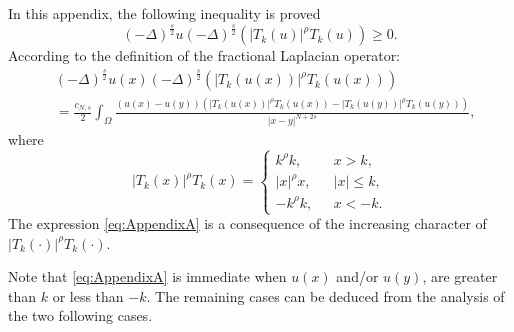 \documentclass[preprint,12pt]{elsarticle}
\begin{document}
		\section{}
		\label{appendix:A}
		In this appendix, the following inequality is proved
		\begin{equation}\label{eq:AppendixA}
			(-\Delta)^{\frac{s}{2}}u(-\Delta)^{\frac{s}{2}}(|T_k(u)|^{\rho}T_k(u))\geq 0.
		\end{equation}
		According to the definition of the fractional Laplacian operator:
		\begin{align*}
			&(-\Delta)^{\frac{s}{2}}u(x)(-\Delta)^{\frac{s}{2}}(|T_k(u(x))|^{\rho}T_k(u(x)))\\&=\frac{{c_{N,s}}}{2}\int_{\Omega}\frac{(u(x)-u(y))(|T_k(u(x))|^{\rho}T_k(u(x))-|T_k(u(y))|^{\rho}T_k(u(y)))}{|x-y|^{N+2s}},
		\end{align*}
		where
		\begin{displaymath} |T_k(x)|^{\rho}T_k(x)=
			\left\{ \begin{array}{ll}
				k^{\rho}k, & \mbox{ $x>k$,} \\
				
				|x|^{\rho}x, & \mbox{ $|x|\leq k$,} \\
				-k^{\rho}k, & \mbox{ $x<-k.$} 
			\end{array}
			\right.
		\end{displaymath}
		The expression \eqref{eq:AppendixA} is a consequence of the increasing character of $|T_k(\cdot)|^{\rho}T_k(\cdot)$. \par Note that \eqref{eq:AppendixA} is immediate when $u(x)$ and/or $u(y)$, are greater than $k$ or less than $-k$. The remaining cases can be deduced from the analysis of the two following cases.
\end{document}
